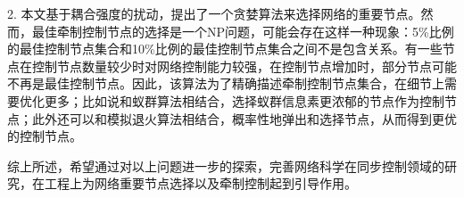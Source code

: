 2.	本文基于耦合强度的扰动，提出了一个贪婪算法来选择网络的重要节点。然而，最佳牵制控制节点的选择是一个NP问题，可能会存在这样一种现象：5\%比例的最佳控制节点集合和10\%比例的最佳控制节点集合之间不是包含关系。有一些节点在控制节点数量较少时对网络控制能力较强，在控制节点增加时，部分节点可能不再是最佳控制节点。因此，该算法为了精确描述牵制控制节点集合，在细节上需要优化更多；比如说和蚁群算法相结合，选择蚁群信息素更浓郁的节点作为控制节点；此外还可以和模拟退火算法相结合，概率性地弹出和选择节点，从而得到更优的控制节点。

综上所述，希望通过对以上问题进一步的探索，完善网络科学在同步控制领域的研究，在工程上为网络重要节点选择以及牵制控制起到引导作用。

\clearpage
